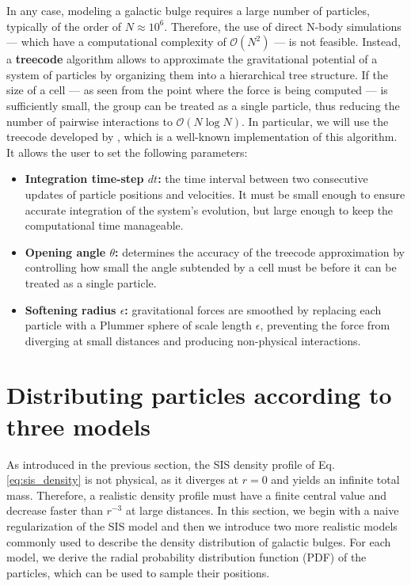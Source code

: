 \documentclass[fleqn,usenatbib]{mnras}
\begin{document}
In any case, modeling a galactic bulge requires a large number of particles, typically of the order of $N \approx 10^6$.
Therefore, the use of direct N-body simulations — which have a computational complexity of $\mathcal{O}(N^2)$ — is not feasible.
Instead, a \textbf{treecode} algorithm allows to approximate the gravitational potential of a system of particles by organizing them into a hierarchical tree structure.
If the size of a cell — as seen from the point where the force is being computed — is sufficiently small, the group can be treated as a single particle, thus reducing the number of pairwise interactions to $\mathcal{O}(N \log N)$.
In particular, we will use the treecode developed by \cite{Barnes1986}, which is a well-known implementation of this algorithm.
It allows the user to set the following parameters:
\begin{itemize}[wide, labelwidth=!, itemindent=!, labelindent=0pt, itemsep=0.1em]
  \item \textbf{Integration time-step $dt$:} the time interval between two consecutive updates of particle positions and velocities. It must be small enough to ensure accurate integration of the system's evolution, but large enough to keep the computational time manageable. 
  \item \textbf{Opening angle $\theta$:} determines the accuracy of the treecode approximation by controlling how small the angle subtended by a cell must be before it can be treated as a single particle.
  \item \textbf{Softening radius $\epsilon$:} gravitational forces are smoothed by replacing each particle with a Plummer sphere of scale length $\epsilon$, preventing the force from diverging at small distances and producing non-physical interactions. 
\end{itemize}


\section{Distributing particles according to three models}\label{sec:observation}
As introduced in the previous section, the SIS density profile of Eq. \ref{eq:sis_density} is not physical, as it diverges at $r=0$ and yields an infinite total mass.
Therefore, a realistic density profile must have a finite central value and decrease faster than $r^{-3}$ at large distances.
In this section, we begin with a naive regularization of the SIS model and then we introduce two more realistic models commonly used to describe the density distribution of galactic bulges.
For each model, we derive the radial probability distribution function (PDF) of the particles, which can be used to sample their positions.
\vspace{0.5em}
\end{document}
